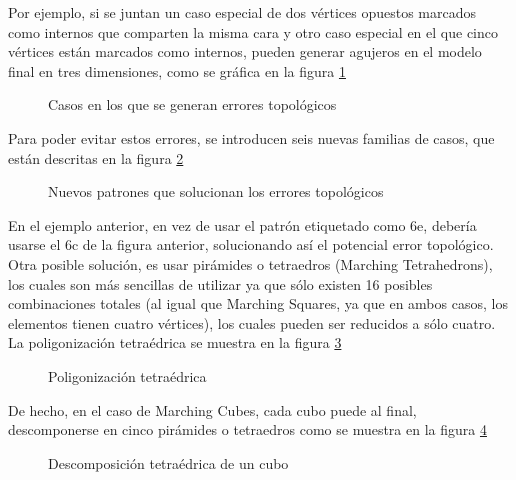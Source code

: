 Por ejemplo, si se juntan un caso especial de dos vértices opuestos marcados como 
internos que comparten la misma cara y otro caso especial en el que cinco vértices están 
marcados como internos, pueden generar agujeros en el modelo final en tres dimensiones, como 
se gráfica en la figura \ref{f:estadoDelArte:MCAmbEx}

\begin{figure}[hbp]
\centering
\caption{Casos en los que se generan errores topológicos}
\label{f:estadoDelArte:MCAmbEx}
\end{figure}

Para poder evitar estos errores, se introducen seis nuevas familias de casos, que están descritas en
la figura \ref{f:estadoDelArte:MCAmb}

\begin{figure}[hbp]
\centering
\caption{Nuevos patrones que solucionan los errores topológicos}
\label{f:estadoDelArte:MCAmb}
\end{figure}

En el ejemplo anterior, en vez de usar el patrón etiquetado como 6e, debería usarse el 6c 
de la figura anterior, solucionando así el potencial error topológico.
Otra posible solución, es usar pirámides o tetraedros (Marching Tetrahedrons), los cuales 
son más sencillas de utilizar ya que sólo existen 16 posibles combinaciones totales (al igual que 
Marching Squares, ya que en ambos casos, los elementos tienen cuatro vértices), los cuales 
pueden ser reducidos a sólo cuatro. La poligonización tetraédrica se muestra en la figura \ref{f:estadoDelArte:image_004}

\begin{figure}[hbp]
\centering
\caption{Poligonización tetraédrica}
\label{f:estadoDelArte:image_004}
\end{figure}

De hecho, en el caso de Marching Cubes, cada cubo puede al final, descomponerse en 
cinco pirámides o tetraedros como se muestra en la figura \ref{f:estadoDelArte:image_006}

\begin{figure}[hbp]
\centering
\caption{Descomposición tetraédrica de un cubo}
\label{f:estadoDelArte:image_006}
\end{figure}
